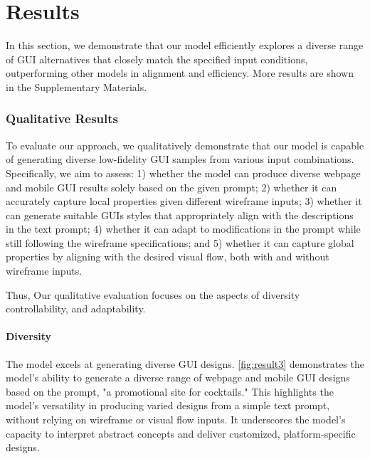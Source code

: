 \section{Results}
\label{sec:experiments}

%







In this section, we demonstrate that our model efficiently explores a diverse range of GUI alternatives that closely match the specified input conditions, outperforming other models in alignment and efficiency. More results are shown in the Supplementary Materials.


\subsubsection{Qualitative Results}


To evaluate our approach, we qualitatively demonstrate that our model is capable of generating diverse low-fidelity GUI samples from various input combinations. Specifically, we aim to assess: 
%
1) whether the model can produce diverse webpage and mobile GUI results solely based on the given prompt; 
%
2) whether it can accurately capture local properties given different wireframe inputs;
%
3) whether it can generate suitable GUIs styles that appropriately align with the descriptions in the text prompt;
%
4) whether it can adapt to modifications in the prompt while still following the wireframe specifications; 
%
and 5) whether it can capture global properties by aligning with the desired visual flow, both with and without wireframe inputs.

Thus, Our qualitative evaluation focuses on the aspects of diversity controllability, and adaptability.

\paragraph{Diversity} 
The model excels at generating diverse GUI designs. 
\autoref{fig:result3} demonstrates the model’s ability to generate a diverse range of webpage and mobile GUI designs based on the prompt, "a promotional site for cocktails." This highlights the model's versatility in producing varied designs from a simple text prompt, without relying on wireframe or visual flow inputs. It underscores the model’s capacity to interpret abstract concepts and deliver customized, platform-specific designs.

